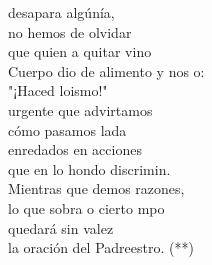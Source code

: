 \begin{cancion}
	desapara algúnía,\\
	 no hemos de olvidar \\
	que quien a quitar vino\\
	Cuerpo dio de alimento y nos o:\\
	"¡Haced loismo!"\\
	\jump
	urgente que advirtamos \\
	cómo pasamos lada\\
	enredados en acciones \\
	que en lo hondo discrimin.\\
	\jump
Mientras que demos razones, \\
	lo que sobra o cierto mpo\\
	quedará sin valez \\
	la oración del Padreestro. (**)\\
\end{cancion}%
